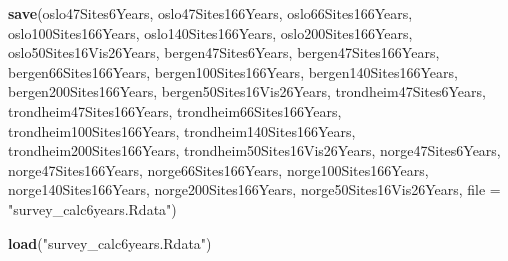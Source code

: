 \documentclass[]{article}
\newenvironment{Shaded}{\begin{snugshade}}{\end{snugshade}}
\newcommand{\KeywordTok}[1]{\textcolor[rgb]{0.13,0.29,0.53}{\textbf{#1}}}
\newcommand{\DataTypeTok}[1]{\textcolor[rgb]{0.13,0.29,0.53}{#1}}
\newcommand{\StringTok}[1]{\textcolor[rgb]{0.31,0.60,0.02}{#1}}
\newcommand{\NormalTok}[1]{#1}
\begin{document}
\begin{Shaded}
\begin{Highlighting}[]
\KeywordTok{save}\NormalTok{(oslo47Sites6Years, oslo47Sites166Years, oslo66Sites166Years, oslo100Sites166Years, }
\NormalTok{    oslo140Sites166Years, oslo200Sites166Years, oslo50Sites16Vis26Years, bergen47Sites6Years, }
\NormalTok{    bergen47Sites166Years, bergen66Sites166Years, bergen100Sites166Years, bergen140Sites166Years, }
\NormalTok{    bergen200Sites166Years, bergen50Sites16Vis26Years, trondheim47Sites6Years, }
\NormalTok{    trondheim47Sites166Years, trondheim66Sites166Years, trondheim100Sites166Years, }
\NormalTok{    trondheim140Sites166Years, trondheim200Sites166Years, trondheim50Sites16Vis26Years, }
\NormalTok{    norge47Sites6Years, norge47Sites166Years, norge66Sites166Years, norge100Sites166Years, }
\NormalTok{    norge140Sites166Years, norge200Sites166Years, norge50Sites16Vis26Years, }
    \DataTypeTok{file =} \StringTok{"survey_calc6years.Rdata"}\NormalTok{)}
\end{Highlighting}
\end{Shaded}

\begin{Shaded}
\begin{Highlighting}[]
\KeywordTok{load}\NormalTok{(}\StringTok{"survey_calc6years.Rdata"}\NormalTok{)}
\end{Highlighting}
\end{Shaded}
\end{document}
